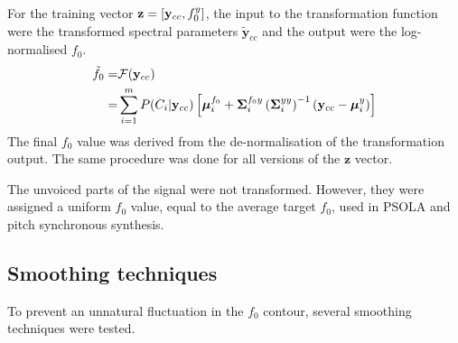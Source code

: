 For the training vector $\mathbf{z} = \left[\mathbf{y}_{cc},f_0^y\right]$, the input to the transformation function were the transformed spectral parameters $\tilde{\mathbf{y}}_{cc}$ and the output were the log-normalised $f_0$.
\begin{equation}
	\label{eq:pitch_transformation}
	\begin{split}
		\tilde{f}_0 =& \mathcal F(\mathbf{y}_{cc})\\
		=& \sum_{i=1}^{m}P(C_i \vert \mathbf{y}_{cc}) \left[\boldsymbol{\mu}_i^{f_0} + \mathbf{\Sigma}_i^{f_0y} \left(\mathbf{\Sigma}_i^{yy}\right)^{-1} (\mathbf{y}_{cc}-\boldsymbol{\mu}_i^y)\right]
	\end{split}
\end{equation}
The final $f_0$ value was derived from the de-normalisation of the transformation output. The same procedure was done for all versions of the $\mathbf{z}$ vector.

The unvoiced parts of the signal were not transformed. However, they were assigned a uniform $f_0$ value, equal to the average target $f_0$, used in PSOLA and pitch synchronous synthesis.


\subsection{Smoothing techniques} %
\label{sub:smoothing_techniques}
To prevent an unnatural fluctuation in the $f_0$ contour, several smoothing techniques were tested. 

